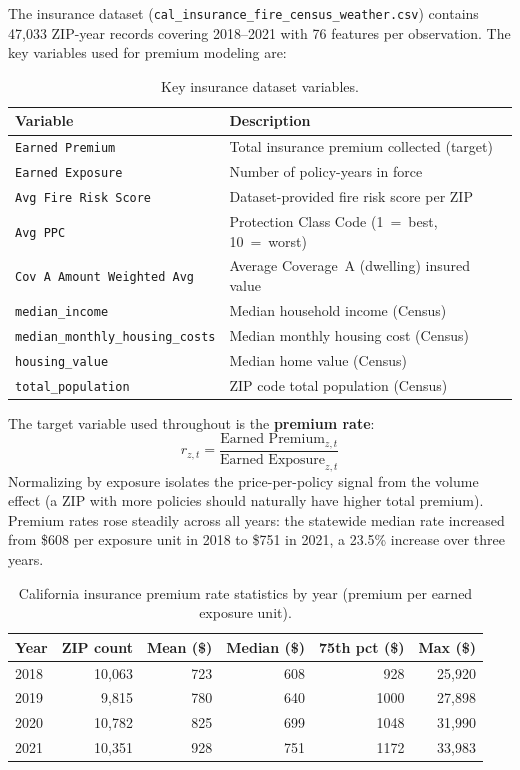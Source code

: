 \documentclass[11pt,a4paper]{article}
\begin{document}
The insurance dataset (\texttt{cal\_insurance\_fire\_census\_weather.csv})
contains 47,033 ZIP-year records covering 2018--2021 with 76 features per
observation. The key variables used for premium modeling are:

\begin{table}[H]
\centering
\caption{Key insurance dataset variables.}
\begin{tabular}{ll}
\toprule
\textbf{Variable} & \textbf{Description} \\
\midrule
\texttt{Earned Premium}        & Total insurance premium collected (target) \\
\texttt{Earned Exposure}       & Number of policy-years in force \\
\texttt{Avg Fire Risk Score}   & Dataset-provided fire risk score per ZIP \\
\texttt{Avg PPC}               & Protection Class Code (1~=~best, 10~=~worst) \\
\texttt{Cov A Amount Weighted Avg} & Average Coverage~A (dwelling) insured value \\
\texttt{median\_income}        & Median household income (Census) \\
\texttt{median\_monthly\_housing\_costs} & Median monthly housing cost (Census) \\
\texttt{housing\_value}        & Median home value (Census) \\
\texttt{total\_population}     & ZIP code total population (Census) \\
\bottomrule
\end{tabular}
\label{tab:ins_vars}
\end{table}

The target variable used throughout is the \textbf{premium rate}:
\begin{equation}
    r_{z,t} = \frac{\text{Earned Premium}_{z,t}}{\text{Earned Exposure}_{z,t}}
    \label{eq:rate}
\end{equation}
Normalizing by exposure isolates the price-per-policy signal from the volume
effect (a ZIP with more policies should naturally have higher total premium).
Premium rates rose steadily across all years: the statewide median rate
increased from \$608 per exposure unit in 2018 to \$751 in 2021, a 23.5\%
increase over three years.

\begin{table}[H]
\centering
\caption{California insurance premium rate statistics by year
         (premium per earned exposure unit).}
\begin{tabular}{lrrrrr}
\toprule
\textbf{Year} & \textbf{ZIP count} & \textbf{Mean (\$)} & \textbf{Median (\$)} & \textbf{75th pct (\$)} & \textbf{Max (\$)} \\
\midrule
2018 & 10,063 & 723  & 608 &  928 & 25,920 \\
2019 &  9,815 & 780  & 640 & 1000 & 27,898 \\
2020 & 10,782 & 825  & 699 & 1048 & 31,990 \\
2021 & 10,351 & 928  & 751 & 1172 & 33,983 \\
\bottomrule
\end{tabular}
\label{tab:rate_stats}
\end{table}
\end{document}

